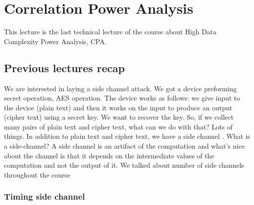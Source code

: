 \chapter{Correlation Power Analysis} \label{c8_fifthcapter}

This lecture is the last technical lecture of the course about High Data
Complexity Power Analysis, CPA.

\section{Previous lectures recap}\label{c8_prev_lectures_recap:sec}

We are interested in laying a side channel attack. We got a device preforming
secret operation, AES operation. The device works as follows: we give input to
the device (plain text) and then it works on the input to produce an output
(cipher text) using a secret key. We want to recover the key. So, if we collect
many pairs of plain text and cipher text, what can we do with that? Lots of
things. In addition to plain text and cipher text, we have a side channel \cite{SideChannel}. What
is a side-channel? A side channel is an artifact of the computation and what's
nice about the channel is that it depends on the intermediate values of the
computation and not the output of it. We talked about number of side channels
throughout the course

\subsection{Timing side channel}\label{c8_prev_lectures_recap_timing_sc:subsec}


